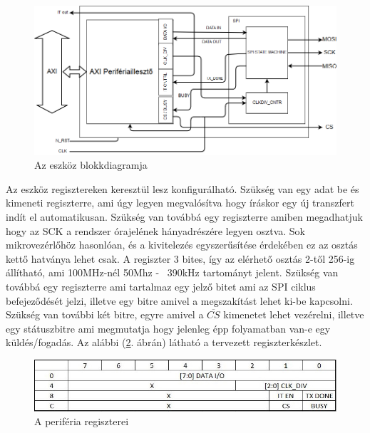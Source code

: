 \documentclass[a4paper,11pt]{article}
\begin{document}
\begin{figure}[H]
	\begin{center}
	\includegraphics[scale=0.5]{system_blockdesign.png}	
	\end{center}
	\caption{Az eszköz blokkdiagramja}
	\label{fig:system_main}
\end{figure}

Az eszköz regisztereken keresztül lesz konfigurálható. Szükség van egy adat be és kimeneti regiszterre, ami úgy legyen megvalósítva hogy íráskor egy új transzfert indít el automatikusan. Szükség van továbbá egy regiszterre amiben megadhatjuk hogy az SCK a rendszer órajelének hányadrészére legyen osztva. Sok mikrovezérlőhöz hasonlóan, és a kivitelezés egyszerűsítése érdekében ez az osztás kettő hatványa lehet csak. A regiszter 3 bites, így az elérhető osztás 2-től 256-ig állítható, ami 100MHz-nél 50Mhz - ~390kHz tartományt jelent. Szükség van továbbá egy regiszterre ami tartalmaz egy jelző bitet ami az SPI ciklus befejeződését jelzi, illetve egy bitre amivel a megszakítást lehet ki-be kapcsolni. Szükség van további két bitre, egyre amivel a $\overline{CS}$ kimenetet lehet vezérelni, illetve egy státuszbitre ami megmutatja hogy jelenleg épp folyamatban van-e egy küldés/fogadás. Az alábbi (\ref{fig:registers}. ábrán) látható a tervezett regiszterkészlet.

\begin{figure}[H]
	\begin{center}
	\includegraphics[scale=1]{reg_set.JPG}	
	\end{center}
	\caption{A periféria regiszterei}
	\label{fig:registers}
\end{figure}
\end{document}
